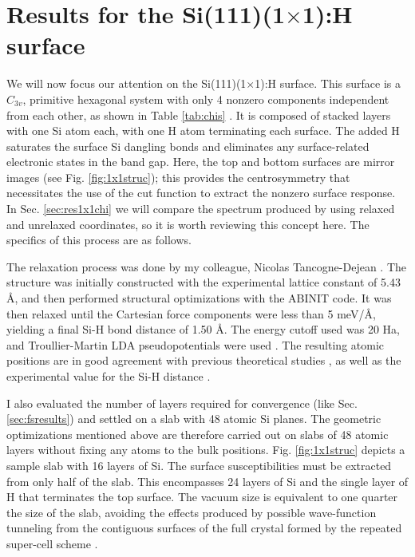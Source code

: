 \section{Results for the \texorpdfstring{Si(111)(1$\times$1):H}{Si(111)(1x1):H}
surface}\label{sec:Si1x1results}

We will now focus our attention on the Si(111)(1$\times$1):H surface. This
surface is a $C_{3v}$, primitive hexagonal system with only 4 nonzero components
independent from each other, as shown in Table \ref{tab:chis} \cite{popovbook,
sipePRB87, mizrahiJOSA88}. It is composed of stacked layers with one Si atom
each, with one H atom terminating each surface. The added H saturates the
surface Si dangling bonds and eliminates any surface-related electronic states
in the band gap. Here, the top and bottom surfaces are mirror images (see Fig.
\ref{fig:1x1struc}); this provides the centrosymmetry that necessitates the use
of the cut function to extract the nonzero surface response. In Sec.
\ref{sec:res1x1chi} we will compare the spectrum produced by using relaxed and
unrelaxed coordinates, so it is worth reviewing this concept here. The specifics
of this process are as follows.

The relaxation process was done by my colleague, Nicolas Tancogne-Dejean
\cite{tancognedejean:tel-01235611}. The structure was initially constructed with
the experimental lattice constant of 5.43 \AA, and then performed structural
optimizations with the ABINIT \cite{gonzeCPS09, abinit} code. It was then
relaxed until the Cartesian force components were less than 5 meV/\AA, yielding
a final Si-H bond distance of 1.50 \AA. The energy cutoff used was 20 Ha, and
Troullier-Martin LDA pseudopotentials were used \cite{troullierPRB91}. The
resulting atomic positions are in good agreement with previous theoretical
studies \cite{kaxirasPRB88, jonaPRB95, alfonsoPRB96, cargnoniJOCP00,
mejiaPRB02}, as well as the experimental value for the Si-H distance
\cite{weastCRC88}.

I also evaluated the number of layers required for convergence (like Sec.
\ref{sec:fsresults}) and settled on a slab with 48 atomic Si planes. The
geometric optimizations mentioned above are therefore carried out on slabs of 48
atomic layers without fixing any atoms to the bulk positions. Fig.
\ref{fig:1x1struc} depicts a sample slab with 16 layers of Si. The surface
susceptibilities must be extracted from only half of the slab. This encompasses
24 layers of Si and the single layer of H that terminates the top surface. The
vacuum size is equivalent to one quarter the size of the slab, avoiding the
effects produced by possible wave-function tunneling from the contiguous
surfaces of the full crystal formed by the repeated super-cell scheme
\cite{mendozaPRB06}.


